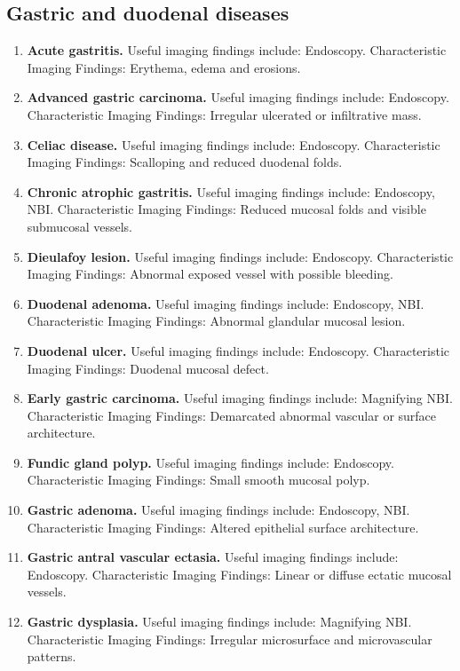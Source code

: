 \subsection{Gastric and duodenal diseases}
\begin{enumerate}[leftmargin=*,itemsep=0.45em,topsep=0.4em]
\item \textbf{Acute gastritis.} Useful imaging findings include: Endoscopy. Characteristic Imaging Findings: Erythema, edema and erosions.
\item \textbf{Advanced gastric carcinoma.} Useful imaging findings include: Endoscopy. Characteristic Imaging Findings: Irregular ulcerated or infiltrative mass.
\item \textbf{Celiac disease.} Useful imaging findings include: Endoscopy. Characteristic Imaging Findings: Scalloping and reduced duodenal folds.
\item \textbf{Chronic atrophic gastritis.} Useful imaging findings include: Endoscopy, NBI. Characteristic Imaging Findings: Reduced mucosal folds and visible submucosal vessels.
\item \textbf{Dieulafoy lesion.} Useful imaging findings include: Endoscopy. Characteristic Imaging Findings: Abnormal exposed vessel with possible bleeding.
\item \textbf{Duodenal adenoma.} Useful imaging findings include: Endoscopy, NBI. Characteristic Imaging Findings: Abnormal glandular mucosal lesion.
\item \textbf{Duodenal ulcer.} Useful imaging findings include: Endoscopy. Characteristic Imaging Findings: Duodenal mucosal defect.
\item \textbf{Early gastric carcinoma.} Useful imaging findings include: Magnifying NBI. Characteristic Imaging Findings: Demarcated abnormal vascular or surface architecture.
\item \textbf{Fundic gland polyp.} Useful imaging findings include: Endoscopy. Characteristic Imaging Findings: Small smooth mucosal polyp.
\item \textbf{Gastric adenoma.} Useful imaging findings include: Endoscopy, NBI. Characteristic Imaging Findings: Altered epithelial surface architecture.
\item \textbf{Gastric antral vascular ectasia.} Useful imaging findings include: Endoscopy. Characteristic Imaging Findings: Linear or diffuse ectatic mucosal vessels.
\item \textbf{Gastric dysplasia.} Useful imaging findings include: Magnifying NBI. Characteristic Imaging Findings: Irregular microsurface and microvascular patterns.

\end{enumerate}
